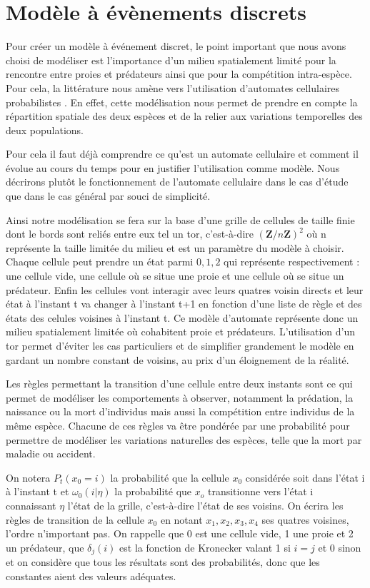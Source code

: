 \chapter{Modèle à évènements discrets}
\label{chapitre:etat_discret}

Pour créer un modèle à événement discret, le point important que nous avons choisi de modéliser est l'importance d'un milieu spatialement limité pour la rencontre entre proies et prédateurs ainsi que pour la compétition intra-espèce. Pour cela, la littérature nous amène vers l'utilisation d'automates cellulaires probabilistes \cite{Karvhallo} . En effet, cette modélisation nous permet de prendre en compte la répartition spatiale des deux espèces et de la relier aux variations temporelles des deux populations. 


Pour cela il faut déjà comprendre ce qu'est un automate cellulaire et comment il évolue au cours du temps pour en justifier l'utilisation comme modèle. Nous décrirons plutôt le fonctionnement de l'automate cellulaire dans le cas d'étude que dans le cas général par souci de simplicité.


Ainsi notre modélisation se fera sur la base d'une grille de cellules de taille finie dont le bords sont reliés entre eux tel un tor, c'est-à-dire ${(\mathbf{Z}/n\mathbf{Z})^2}$ où n représente la taille limitée du milieu et est un paramètre du modèle à choisir. Chaque cellule peut prendre un état parmi ${0,1,2}$ qui représente respectivement : une cellule vide, une cellule où se situe une proie et une cellule où se situe un prédateur. Enfin les cellules vont interagir avec leurs quatres voisin directs et leur état à l'instant t va changer à l'instant t+1 en fonction d'une liste de règle et des états des celules voisines à l'instant t. Ce modèle d'automate représente donc un milieu spatialement limitée où cohabitent proie et prédateurs. L'utilisation d'un tor permet d'éviter les cas particuliers et de simplifier grandement le modèle en gardant un nombre constant de voisins, au prix d'un éloignement de la réalité.


Les règles permettant la transition d'une cellule entre deux instants sont ce qui permet de modéliser les comportements à observer, notamment la prédation, la naissance ou la mort d'individus mais aussi la compétition entre individus de la même espèce. Chacune de ces règles va être pondérée par une probabilité pour permettre de modéliser les variations naturelles des espèces, telle que la mort par maladie ou accident.


On notera $ P_{t}(x_0=i)$ la probabilité que la cellule $x_0$ considérée soit dans l'état i à l'instant t et $\omega_0(i|\eta)$ la probabilité que $x_o$ transitionne vers l'état i connaissant $\eta$ l'état de la grille, c'est-à-dire l'état de ses voisins. On écrira les règles de transition de la cellule $x_0$ en notant $x_1, x_2, x_3, x_4$ ses quatres voisines, l'ordre n'important pas. On rappelle que 0 est une cellule vide, 1 une proie et 2 un prédateur, que $\delta_{j}(i)$ est la fonction de Kronecker valant 1 si $i=j$ et 0 sinon et on considère que tous les résultats sont des probabilités, donc que les constantes aient des valeurs adéquates.


